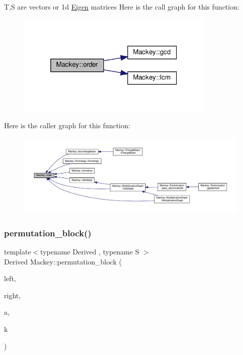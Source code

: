 T,S are vectors or 1d \hyperlink{namespaceEigen}{Eigen} matrices Here is the call graph for this function\+:\nopagebreak
\begin{figure}[H]
\begin{center}
\leavevmode
\includegraphics[width=268pt]{namespaceMackey_a4abdca157edcf425b1e7ceff39d74c2f_cgraph}
\end{center}
\end{figure}
Here is the caller graph for this function\+:\nopagebreak
\begin{figure}[H]
\begin{center}
\leavevmode
\includegraphics[width=350pt]{namespaceMackey_a4abdca157edcf425b1e7ceff39d74c2f_icgraph}
\end{center}
\end{figure}
\mbox{\label{namespaceMackey_ae54ebc8588d873a744541394ac5113f0}} 
\subsubsection{\texorpdfstring{permutation\+\_\+block()}{permutation\_block()}}
{\footnotesize\ttfamily template$<$typename Derived , typename S $>$ \\
Derived Mackey\+::permutation\+\_\+block (\begin{DoxyParamCaption}\item[{const Eigen\+::\+Permutation\+Matrix$<$-\/1, -\/1, S $>$ \&}]{left,  }\item[{const Eigen\+::\+Permutation\+Matrix$<$-\/1, -\/1, S $>$ \&}]{right,  }\item[{const Eigen\+::\+Matrix\+Base$<$ Derived $>$ \&}]{a,  }\item[{int}]{k }\end{DoxyParamCaption})}



